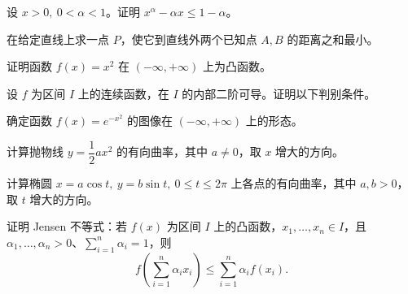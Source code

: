 \noindent\begin{minipage}{\textwidth}
设 $x>0,\ 0<\alpha<1$。证明 $x^\alpha-\alpha x\le1-\alpha$。
\end{minipage}\par\vfill
\newpage
\noindent\begin{minipage}{\textwidth}
在给定直线上求一点 $P$，使它到直线外两个已知点 $A,B$ 的距离之和最小。
\end{minipage}\par\vfill
\noindent\begin{minipage}{\textwidth}
证明函数 $f(x)=x^2$ 在 $(-\infty,+\infty)$ 上为凸函数。
\end{minipage}\par\vfill
\noindent\begin{minipage}{\textwidth}
设 $f$ 为区间 $I$ 上的连续函数，在 $I$ 的内部二阶可导。证明以下判别条件。
\end{minipage}\par\vfill
\noindent\begin{minipage}{\textwidth}
确定函数 $f(x)=e^{-x^2}$ 的图像在 $(-\infty,+\infty)$ 上的形态。
\end{minipage}\par\vfill
\newpage
\noindent\begin{minipage}{\textwidth}
计算抛物线 $y=\dfrac12ax^2$ 的有向曲率，其中 $a\ne0$，取 $x$ 增大的方向。
\end{minipage}\par\vfill
\noindent\begin{minipage}{\textwidth}
计算椭圆 $x=a\cos t,\ y=b\sin t,\ 0\le t\le2\pi$ 上各点的有向曲率，其中 $a,b>0$，取 $t$ 增大的方向。
\end{minipage}\par\vfill
\noindent\begin{minipage}{\textwidth}
证明 Jensen 不等式：若 $f(x)$ 为区间 $I$ 上的凸函数，$x_1,\ldots,x_n\in I$，且 $\alpha_1,\ldots,\alpha_n>0$、$\sum_{i=1}^n\alpha_i=1$，则\[f\left(\sum_{i=1}^n\alpha_i x_i\right)\le\sum_{i=1}^n\alpha_i f(x_i).\]
\end{minipage}\par\vfill

